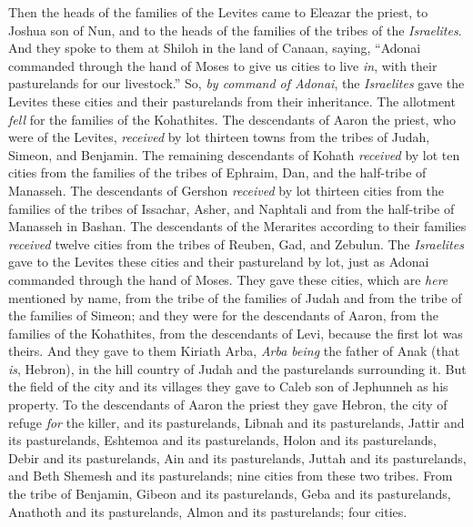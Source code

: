 \begin{biblechapter} %
 Then the heads of the families of the Levites came to Eleazar the priest, to Joshua son of Nun, and to the heads of the families of the tribes of the \textit{Israelites}.
\verse And they spoke to them at Shiloh in the land of Canaan, saying, “Adonai commanded through the hand of Moses to give us cities to live \textit{in}, with their pasturelands for our livestock.”
\verse So, \textit{by command of Adonai}, the \textit{Israelites} gave the Levites these cities and their pasturelands from their inheritance.
\verse The allotment \textit{fell} for the families of the Kohathites. The descendants of Aaron the priest, who were of the Levites, \textit{received} by lot thirteen towns from the tribes of Judah, Simeon, and Benjamin.
\verse The remaining descendants of Kohath \textit{received} by lot ten cities from the families of the tribes of Ephraim, Dan, and the half-tribe of Manasseh.
\verse The descendants of Gershon \textit{received} by lot thirteen cities from the families of the tribes of Issachar, Asher, and Naphtali and from the half-tribe of Manasseh in Bashan.
\verse The descendants of the Merarites according to their families \textit{received} twelve cities from the tribes of Reuben, Gad, and Zebulun.
\verse The \textit{Israelites} gave to the Levites these cities and their pastureland by lot, just as Adonai commanded through the hand of Moses.
\verse They gave these cities, which are \textit{here} mentioned by name, from the tribe of the families of Judah and from the tribe of the families of Simeon;
\verse and they were for the descendants of Aaron, from the families of the Kohathites, from the descendants of Levi, because the first lot was theirs.
\verse And they gave to them Kiriath Arba, \textit{Arba being} the father of Anak (that \textit{is}, Hebron), in the hill country of Judah and the pasturelands surrounding it.
\verse But the field of the city and its villages they gave to Caleb son of Jephunneh as his property.
\verse To the descendants of Aaron the priest they gave Hebron, the city of refuge \textit{for} the killer, and its pasturelands, Libnah and its pasturelands,
\verse Jattir and its pasturelands, Eshtemoa and its pasturelands,
\verse Holon and its pasturelands, Debir and its pasturelands,
\verse Ain and its pasturelands, Juttah and its pasturelands, and Beth Shemesh and its pasturelands; nine cities from these two tribes.
\verse From the tribe of Benjamin, Gibeon and its pasturelands, Geba and its pasturelands,
\verse Anathoth and its pasturelands, Almon and its pasturelands; four cities.

\end{biblechapter}
